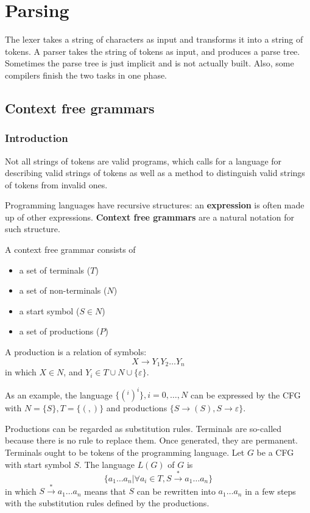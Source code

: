 \ifx\PREAMBLE\undefined


\fi
\chapter{Parsing}
The lexer takes a string of characters as input and transforms it into a string of tokens. A parser takes the string of tokens as input, and produces a parse tree. Sometimes the parse tree is just implicit and is not actually built. Also, some compilers finish the two tasks in one phase.
\section{Context free grammars}
\subsection{Introduction}
Not all strings of tokens are valid programs, which calls for a language for describing valid strings of tokens as well as a method to distinguish valid strings of tokens from invalid ones.

Programming languages have recursive structures: an {\bf expression} is often made up of other expressions. {\bf Context free grammars} are a natural notation for such structure.

A context free grammar consists of 
\begin{itemize}
\item a set of terminals  ($T$)
\item a set of non-terminals ($N$)
\item a start symbol ($S\in N$)
\item a set of productions ($P$)
\end{itemize}

A production is a relation of symbols:
\begin{equation}
X\rightarrow Y_1Y_2\dots Y_n
\end{equation}
in which $X\in N$, and $Y_i\in T\cup N\cup \{\varepsilon\}$. 

As an example, the language $\{(^i)^i\} ,i = 0,\dots,N$ can be expressed by the CFG with  $N = \{S\}, T = \{(,)\}$
and productions $\{S\rightarrow (S), S\rightarrow \varepsilon \}$.

Productions can be regarded as substitution rules. Terminals are so-called because there is no rule to replace them. Once generated, they are permanent. Terminals ought to be tokens of the programming language. Let $G$ be a CFG with start symbol $S$. The language $L(G)$ of $G$ is 
\begin{equation}
\{a_1\dots a_n|\forall a_i\in T, S\xrightarrow{*}a_1\dots a_n\}
\end{equation}
in which $S\xrightarrow{*}a_1\dots a_n$ means that $S$ can be rewritten into $a_1\dots a_n$ in a few steps with the substitution rules defined by the productions.

